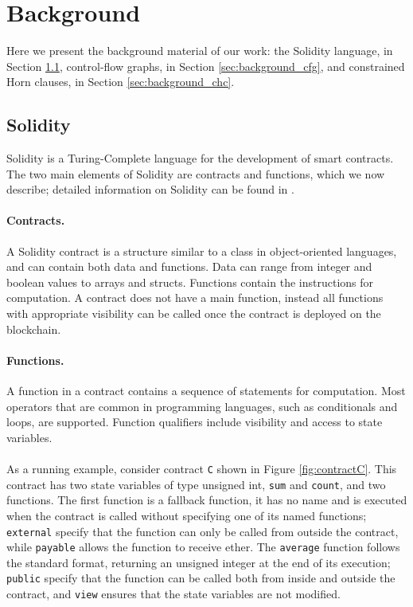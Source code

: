 \section{Background}

Here we present the background material of our work: the Solidity language, in Section \ref{sec:background_sol}, control-flow graphs, in Section \ref{sec:background_cfg}, and constrained Horn clauses, in Section \ref{sec:background_chc}.


\subsection{Solidity} \label{sec:background_sol}

Solidity is a Turing-Complete language for the development of smart contracts. The two main elements of Solidity are contracts and functions, which we now describe; detailed information on Solidity can be found in \cite{}. 

\paragraph{Contracts.} A Solidity contract is a structure similar to a class in object-oriented languages, and can contain both data and functions. Data can range from integer and boolean values to arrays and structs. Functions contain the instructions for computation. A contract does not have a main function, instead all functions with appropriate visibility can be called once the contract is deployed on the blockchain.

\paragraph{Functions.} A function in a contract contains a sequence of statements for computation. Most operators that are common in programming languages, such as conditionals and loops, are supported. Function qualifiers include visibility and access to state variables. 

\paragraph{} As a running example, consider contract \texttt{C} shown in Figure \ref{fig:contractC}. This contract has two state variables of type unsigned int, \texttt{sum} and \texttt{count}, and two functions. The first function is a fallback function, it has no name and is executed when the contract is called without specifying one of its named functions; \texttt{external} specify that the function can only be called from outside the contract, while \texttt{payable} allows the function to receive ether. The \texttt{average} function follows the standard format, returning an unsigned integer at the end of its execution; \texttt{public} specify that the function can be called both from inside and outside the contract, and \texttt{view} ensures that the state variables are not modified.

